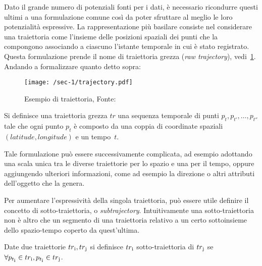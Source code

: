 Dato il grande numero di potenziali fonti per i dati, è necessario ricondurre questi ultimi a una formulazione comune
così da poter sfruttare al meglio le loro potenzialità espressive.
La rappresentazione più basilare consiste nel considerare una traiettoria come l'insieme delle posizioni
spaziali dei punti che la compongono associando a ciascuno l'istante temporale in cui è stato registrato.
Questa formulazione prende il nome di traiettoria grezza (\textit{raw trajectory}), vedi~\cref{fig:chap-1:trajectory}.
Andando a formalizzare quanto detto sopra:

\begin{figure}
  \centering
  \texttt{[image: /sec-1/trajectory.pdf]}
  \caption{Esempio di traiettoria, Fonte:~\cite{Feng2016ASO}}%
  \label{fig:chap-1:trajectory}
\end{figure}

\theoremstyle{definition}
\begin{definition}[Traiettoria]

  Si definisce una traiettoria grezza \(tr\) una sequenza temporale di punti \({p_{t}, p_{t'},\ldots, p_{t''}}\)
  tale che ogni punto \(p_{t}\) è composto da una coppia di coordinate spaziali \((latitude, longitude)\) e un tempo~\(t\).

\end{definition}

Tale formulazione può essere successivamente complicata, ad esempio adottando
una scala unica tra le diverse traiettorie per lo spazio e una per il tempo, oppure aggiungendo ulteriori informazioni, come ad esempio la direzione o altri attributi
dell'oggetto che la genera.

Per aumentare l'espressività della singola traiettoria, può essere utile definire il concetto di sotto-traiettoria, o \textit{subtrajectory}.
Intuitivamente una sotto-traiettoria non è altro che un segmento di una traiettoria relativo a un certo sottoinsieme dello spazio-tempo coperto da quest'ultima.

\begin{definition}

  Date due traiettorie \(tr\textsubscript{i}, tr\textsubscript{j}\) si definisce  \(tr\textsubscript{i}\) sotto-traiettoria di \(tr\textsubscript{j}\) se \(\forall p_{t\textsubscript{i}} \in tr\textsubscript{i}, p_{t\textsubscript{i}} \in tr\textsubscript{j}\).

\end{definition}

